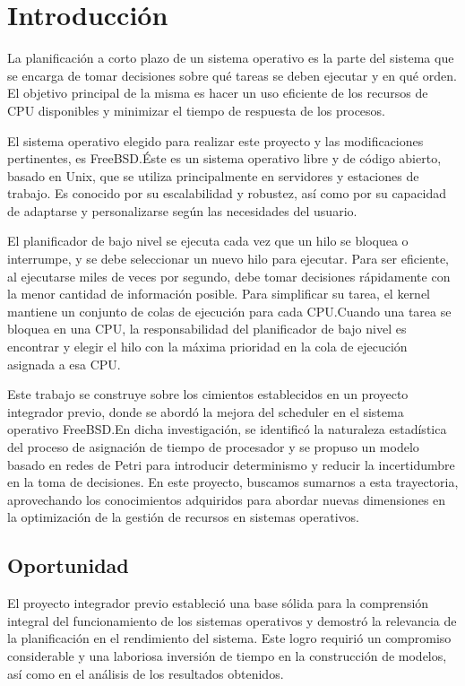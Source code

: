 \section{Introducción}
La planificación a corto plazo de un sistema operativo es la parte del sistema que se encarga de tomar decisiones sobre qué tareas se deben ejecutar y en qué orden. El objetivo principal de la misma es hacer un uso eficiente de los recursos de CPU disponibles y minimizar el tiempo de respuesta de los procesos.\par

El sistema operativo elegido para realizar este proyecto y las modificaciones pertinentes, es FreeBSD.\@ Éste es un sistema operativo libre y de código abierto, basado en Unix, que se utiliza principalmente en servidores y estaciones de trabajo. Es conocido por su escalabilidad y robustez, así como por su capacidad de adaptarse y personalizarse según las necesidades del usuario.\par


El planificador de bajo nivel se ejecuta cada vez que un hilo se bloquea o interrumpe, y se debe seleccionar un nuevo hilo para ejecutar. Para ser eficiente, al ejecutarse miles de veces por segundo, debe tomar decisiones rápidamente con la menor cantidad de información posible. Para simplificar su tarea, el kernel mantiene un conjunto de colas de ejecución para cada CPU.\@ Cuando una tarea se bloquea en una CPU, la responsabilidad del planificador de bajo nivel es encontrar y elegir el hilo con la máxima prioridad en la cola de ejecución asignada a esa CPU.\par

Este trabajo se construye sobre los cimientos establecidos en un proyecto integrador previo, donde se abordó la mejora del scheduler en el sistema operativo FreeBSD.\@ En dicha investigación, se identificó la naturaleza estadística del proceso de asignación de tiempo de procesador y se propuso un modelo basado en redes de Petri para introducir determinismo y reducir la incertidumbre en la toma de decisiones. En este proyecto, buscamos sumarnos a esta trayectoria, aprovechando los conocimientos adquiridos para abordar nuevas dimensiones en la optimización de la gestión de recursos en sistemas operativos.\par

\subsection{Oportunidad}
El proyecto integrador previo estableció una base sólida para la comprensión integral del funcionamiento de los sistemas operativos y demostró la relevancia de la planificación en el rendimiento del sistema. Este logro requirió un compromiso considerable y una laboriosa inversión de tiempo en la construcción de modelos, así como en el análisis de los resultados obtenidos.\par

